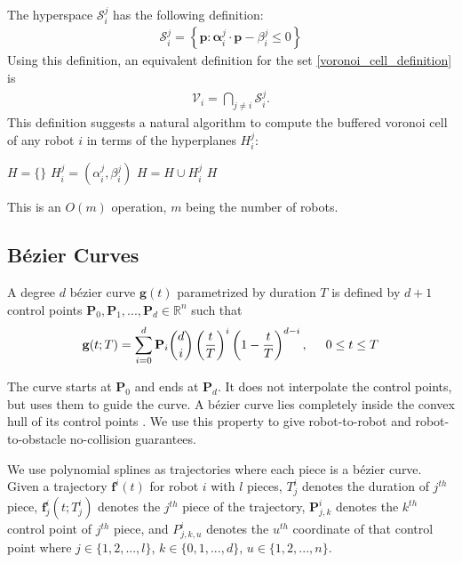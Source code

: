 \documentclass{svproc}
\newcommand{\vp}{\mathbf{p}}
\newcommand{\valpha}{\mathbf{\alpha}}
\newcommand{\vP}{\mathbf{P}}
\newcommand{\vg}{\mathbf{g}}
\newcommand{\vf}{\mathbf{f}}
\newcommand{\cV}{\mathcal{V}}
\newcommand{\cS}{\mathcal{S}}
\newcommand{\R}{\mathbb{R}} %
\begin{document}
The hyperspace $\cS_i^j$ has the following definition:
\begin{align}
    \cS_i^j = \left\{\vp : \valpha_i^j \cdot \vp - \beta_i^j \leq 0\right\}
\end{align}
Using this definition, an equivalent definition for the set \eqref{voronoi_cell_definition} is
\begin{align}
    \cV_i = \bigcap\limits_{j\neq i} \cS_i^j. \label{voronoi_intersection_definition}
\end{align}
This definition suggests a natural algorithm to compute the buffered voronoi cell of any robot $i$ in terms of the hyperplanes $H_i^j$:
\begin{algorithmic}[1]
        \State $H = \{\}$
            \State $H_i^j = (\alpha_i^j, \beta_i^j)$
            \State $H = H\cup H_i^j$
        \EndFor
        \State \Return $H$
    \EndFunction
\end{algorithmic}
This is an $O(m)$ operation, $m$ being the number of robots.


\subsection{B\'ezier Curves}
A degree $d$ b\'ezier curve $\vg(t)$ parametrized by duration $T$ is defined by $d+1$ control points $\vP_0, \vP_1, ..., \vP_d \in \R^n$ such that
\begin{align}
    \vg(t; T) = \sum_{i=0}^d \vP_i {d\choose i}\left(\frac{t}{T}\right)^i\left(1-\frac{t}{T}\right)^{d-i},\hskip .5cm 0\leq t \leq T
\end{align}

The curve starts at $\vP_0$ and ends at $\vP_d$. It does not interpolate the control points, but uses them to guide the curve. A b\'ezier curve lies completely inside the convex hull of its control points \cite{Bernstein}. We use this property to give robot-to-robot and robot-to-obstacle no-collision guarantees.

We use polynomial splines as trajectories where each piece is a b\'ezier curve. Given a trajectory $\vf^i(t)$ for robot $i$ with $l$ pieces, $T^i_j$ denotes the duration of $j^{th}$ piece, $\vf^i_j(t; T^i_j)$ denotes the $j^{th}$ piece of the trajectory, $\vP^i_{j,k}$ denotes the $k^{th}$ control point of $j^{th}$ piece, and $P^i_{j,k,u}$ denotes the $u^{th}$ coordinate of that control point where $j \in \{1,2,...,l\}$, $k \in \{0,1,...,d\}$, $u \in \{1,2,...,n\}$.
\end{document}
